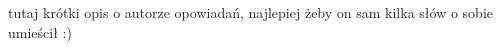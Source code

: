 \documentclass[./MAIN.tex]{subfiles}
\begin{document}
tutaj krótki opis o autorze opowiadań, najlepiej żeby on sam kilka słów o sobie umieścił :)
\end{document}
